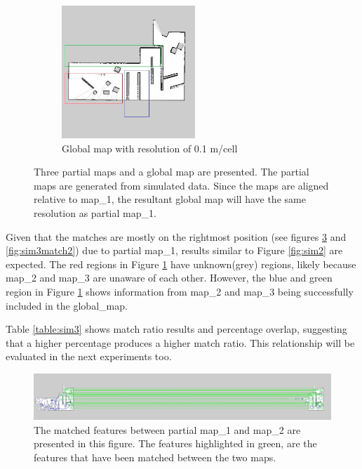 \begin{figure}[H]
\begin{subfigure}{0.5\textwidth}
\includegraphics[width=0.9\linewidth, height=5cm]{figs/simulation_results/c/final_map_marked.jpg} 
\caption{Global map with resolution of 0.1 m/cell}
\label{fig:sim34}
\end{subfigure}
\caption{Three partial maps and a global map are presented. The partial maps are generated from simulated data. Since the maps are aligned relative to map\_1, the resultant global map will have the same resolution as partial map\_1.}
\label{fig:sim3}
\end{figure}


Given that the matches are mostly on the rightmost position (see figures \ref{fig:sim3match1} and  \ref{fig:sim3match2}) due to partial map\_1, results similar to Figure \ref{fig:sim2} are expected. The red regions in Figure \ref{fig:sim34} have unknown(grey) regions, likely because map\_2 and map\_3 are unaware of each other. However, the blue and green region in Figure \ref{fig:sim34} shows information from map\_2 and map\_3 being successfully included in the global\_map. 

Table \ref{table:sim3} shows match ratio results and percentage overlap, suggesting that a higher percentage produces a higher match ratio. This relationship will be evaluated in the next experiments too.

\begin{figure}[H]
    \centering
    \includegraphics[width=1\textwidth]{figs/simulation_results/c/matchesPartialMap1Map2.jpg}
    \caption{The matched features between partial map\_1 and map\_2 are presented in this figure. The features highlighted in green, are the features that have been matched between the two maps.}
    \label{fig:sim3match1}
\end{figure} 

